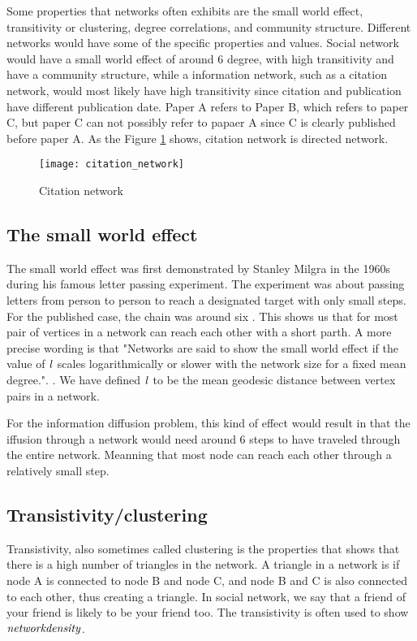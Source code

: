 Some properties that networks often exhibits are the small world effect, transitivity or clustering, degree correlations, and community structure\cite{ComplexNetwork2003}. Different networks would have some of the specific properties and values. Social network would have a small world effect of around 6 degree, with high transitivity and have a community structure, while a information network, such as a citation network, would most likely have high transitivity since citation and publication have different publication date. Paper A refers to Paper B, which refers to paper C, but paper C can not possibly refer to papaer A since C is clearly published before paper A. As the Figure \ref{fig:CitationN} shows, citation network is directed network.

\begin{figure}[!ht]
	\texttt{[image: citation\_network]}
	\caption{Citation network} 
	\label{fig:CitationN}
\end{figure}

\subsection{The small world effect}
The small world effect was first demonstrated by Stanley Milgra in the 1960s during his famous letter passing experiment\cite{SmallWorldProblemSmilgram1960}. The experiment was about passing letters from person to person to reach a designated target with only small steps. For the published case, the chain was around six \cite{Experiment1969}. This shows us that for most pair of vertices in a network can reach each other with a short parth. A more precise wording is that "Networks are said to show the small world effect if the value of $\it{l}$ scales logarithmically or slower with the network size for a fixed mean degree.". \cite{ComplexNetwork2003}. We have defined $\it{l} $ to be the mean geodesic distance between vertex pairs in a network.

For the information diffusion problem, this kind of effect would result in that the  iffusion through a network would need around 6 steps to have traveled through the entire network. Meanning that most node can reach each other through a relatively small step.

\subsection{Transistivity/clustering}
Transistivity, also sometimes called clustering is the properties that shows that there is a high number of triangles in the network. A triangle in a network is if node A is connected to node B and node C, and node B and C is also connected to each other, thus creating a triangle. In social network, we say that a friend of your friend is likely to be your friend too\cite{ComplexNetwork2003}. The transistivity is often used to show $\it{network density}$.

